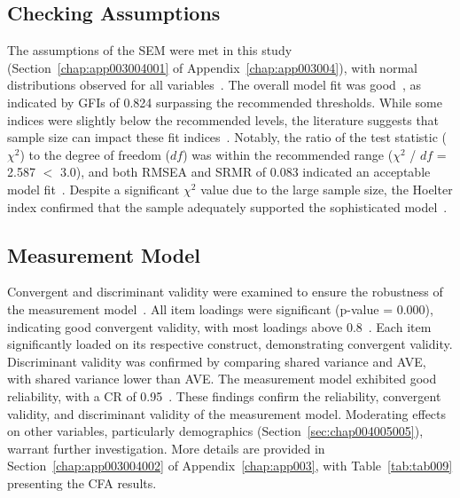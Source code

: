 \subsection{Checking Assumptions}
\label{sec:chap004005001}

The assumptions of the \ac{SEM} were met in this study (Section~\ref{chap:app003004001} of Appendix~\ref{chap:app003004}), with normal distributions observed for all variables~\cite{murtagh2012multivariate}.
The overall model fit was good~\cite{Bagozzi2012, doi:10.1504/IJMDA.2017.087624, murtagh2012multivariate, SUMAK2016602}, as indicated by \acp{GFI} of 0.824 surpassing the recommended thresholds.
While some indices were slightly below the recommended levels, the literature suggests that sample size can impact these fit indices~\cite{KHALILZADEH2017460, doi:10.1080/00273171.2019.1602503, ZHOU2010760}.
Notably, the ratio of the test statistic ($\chi^2$) to the degree of freedom ($df$) was within the recommended range ($\chi^2$ / $df$ = 2.587 $<$ 3.0), and both \ac{RMSEA} and \ac{SRMR} of 0.083 indicated an acceptable model fit~\cite{ZHOU2010760}.
Despite a significant $\chi^2$ value due to the large sample size, the Hoelter index confirmed that the sample adequately supported the sophisticated model~\cite{https://doi.org/10.1002/nur.20088}.

\subsection{Measurement Model}
\label{sec:chap004005002}

Convergent and discriminant validity were examined to ensure the robustness of the measurement model~\cite{10.3389/fpubh.2018.00149, Henseler2015}.
All item loadings were significant (p-value = 0.000), indicating good convergent validity, with most loadings above 0.8~\cite{info:doi/10.2196/14316}.
Each item significantly loaded on its respective construct, demonstrating convergent validity.
Discriminant validity was confirmed by comparing shared variance and \ac{AVE}, with shared variance lower than \ac{AVE}.
The measurement model exhibited good reliability, with a \ac{CR} of 0.95~\cite{Bagozzi2012, doi:10.1504/IJMDA.2017.087624, murtagh2012multivariate, SUMAK2016602}.
These findings confirm the reliability, convergent validity, and discriminant validity of the measurement model.
Moderating effects on other variables, particularly demographics (Section~\ref{sec:chap004005005}), warrant further investigation.
More details are provided in Section~\ref{chap:app003004002} of Appendix~\ref{chap:app003}, with Table~\ref{tab:tab009} presenting the \ac{CFA} results.

